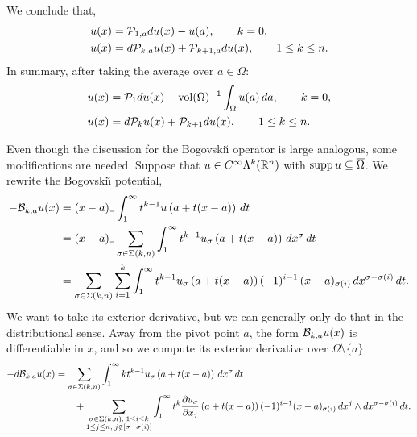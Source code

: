\documentclass[10pt,a4paper]{article}
\begin{document}
\endgroup
We conclude that, 
\begin{align*}
    u(x) &= {\mathcal P}_{1,a} d u(x) - u(a), \qquad k = 0,
    \\
    u(x) &= d {\mathcal P}_{k,a} u(x) + {\mathcal P}_{k+1,a} d u(x), \qquad 1 \leq k \leq n.
\end{align*}
In summary, after taking the average over $a \in \Omega$:
\begin{align}\label{math:hodgedecomposition:poinc}
    u(x) &= {\mathcal P}_{1} d u(x) - \operatorname{vol}(\Omega)^{-1} \int_\Omega u(a) \,da, \qquad k = 0,
    \\
    u(x) &= d {\mathcal P}_{k} u(x) + {\mathcal P}_{k+1} d u(x), \qquad 1 \leq k \leq n.
\end{align}

Even though the discussion for the Bogovski\u{\i} operator is large analogous, some modifications are needed. 
Suppose that $u \in C^{\infty}\Lambda^{k}({\mathbb R}^n)$ with $\operatorname{supp} u \subseteq \overline\Omega$.
We rewrite the Bogovski\u{\i} potential,
\begin{align*}
    - 
    {\mathcal B}_{k,a} u(x) 
    &= 
    (x-a)\lrcorner \int_{1}^\infty t^{k-1} u\left(a+t(x-a)\right)\,dt 
    \\&
    = 
    (x-a)\lrcorner 
    \sum_{\sigma \in \Sigma(k,n)}
    \int_{1}^\infty 
    t^{k-1} u_{\sigma}\left(a+t(x-a)\right) \,dx^{\sigma} \,dt 
    \\&
    = 
    \sum_{\sigma \in \Sigma(k,n)} \sum_{i=1}^{k}
    \int_{1}^\infty 
    t^{k-1} u_{\sigma}\left(a+t(x-a)\right) (-1)^{i-1} \,(x-a)_{\sigma(i) } \,dx^{\sigma-\sigma(i)} \,dt 
    .
\end{align*}
We want to take its exterior derivative, but we can generally only do that in the distributional sense. 
Away from the pivot point $a$, the form ${\mathcal B}_{k,a} u(x)$ is differentiable in $x$, 
and so we compute its exterior derivative over $\Omega \setminus \{a\}$:
\begin{align*}
    - 
    d {\mathcal B}_{k,a} u(x) 
    &= 
    \sum_{\sigma \in \Sigma(k,n)} 
    \int_{1}^\infty 
    k t^{k-1} u_{\sigma}\left(a+t(x-a)\right) \,dx^{\sigma} \,dt 
    \\&\qquad
    + 
    \sum_{\substack{ \sigma \in \Sigma(k,n), \; 1 \leq i \leq k \\ 1 \leq j \leq n, \; j \notin [\sigma-\sigma(i)] }}
    \int_{1}^\infty 
    t^{k} \frac{ \partial u_{\sigma} }{\partial x_{j}}\left(a+t(x-a)\right) (-1)^{i-1} (x-a)_{\sigma(i) } \,dx^{j} \wedge dx^{\sigma-\sigma(i)} \,dt 
    .
\end{align*}
\end{document}
